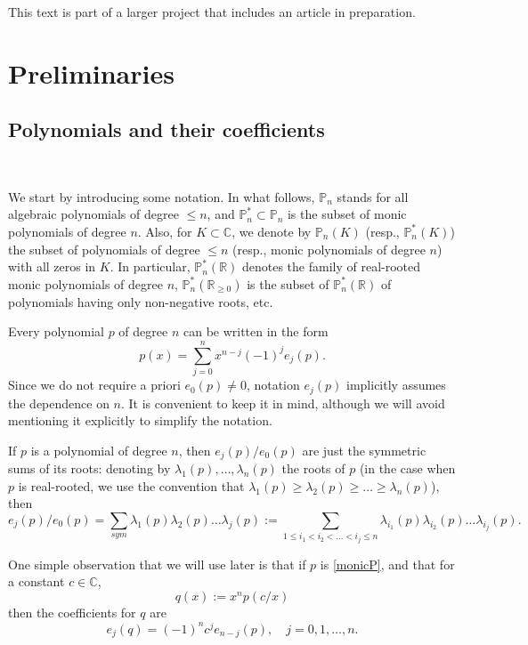 \documentclass[reqno,11pt]{amsart}
\theoremstyle{remark}
\renewcommand{\P}{\mathbb{P}}
\newcommand{\R}{\mathbb{R}}
\newcommand{\C}{\mathbb{C}}
\newcommand{\monicpols}{\mathbb P_n^*}
\newcommand{\monicpolreal}{\mathbb P_n^*(\mathbb R)}
\begin{document}
This text is part of a larger project that includes an article \cite{MFMP} in preparation.

 
\section{Preliminaries }
\label{sec:preliminaries}

\subsection{Polynomials and their coefficients} \label{subsec:polynomials}\

We start by introducing some notation. In what follows, $\P_n$ stands for all algebraic polynomials of degree $\le n$, and $\monicpols \subset \P_n$ is the subset of monic polynomials of degree $n$. Also, for $K\subset \C$, we denote by $\P_n(K) $ (resp., $\monicpols(K)$) the subset of polynomials of degree $\le n$ (resp., monic polynomials of degree $n$) with all zeros in $K$. In particular, $\monicpolreal$ denotes the family of real-rooted monic polynomials of degree $n$, $\monicpols(\R_{\ge 0})$ is the subset of $\monicpolreal$ of polynomials having only non-negative roots, etc. 

Every polynomial $p$ of degree $n$ can be written in the form
\begin{equation}\label{monicP}
    p(x)=\sum_{j=0}^n x^{n-j} (-1)^j e_j(p).
\end{equation}
Since we do not require a priori $e_0(p)\neq 0$, notation $e_j(p)$ implicitly assumes the dependence on $n$. It is convenient to keep it in mind, although we will avoid mentioning it explicitly to simplify the notation.

If $p$ is a polynomial of degree $n$, then  $e_j(p)/ e_0(p)$ are just the symmetric sums of its roots: denoting by  $\lambda_1(p),\dots, \lambda_n(p)$ the roots of $p$ (in the case when $p$ is real-rooted, we use the convention that $\lambda_1(p)\geq \lambda_2(p)\geq \dots \geq \lambda_n(p)$), then 
\begin{equation}
    \label{zerossymmetric}
e_j(p)/ e_0(p)=\sum_{sym} \lambda_1(p)\lambda_2(p)\dots \lambda_j(p):=\sum_{1\leq i_1<i_2<\dots< i_j\leq n} \lambda_{i_1}(p)\lambda_{i_2}(p)\dots \lambda_{i_j}(p).
\end{equation}

One simple observation that we will use later is that if $p$ is \eqref{monicP}, and that for a constant $c\in \C $,  
$$
 q(x):=x^n p(c/x) 
$$
then the coefficients for $q$ are
\begin{equation}
    \label{eq:monicreversed}
e_j(q) = (-1)^n c^j e_{n-j}(p), \quad j=0, 1, \dots, n.     
\end{equation}
\end{document}
